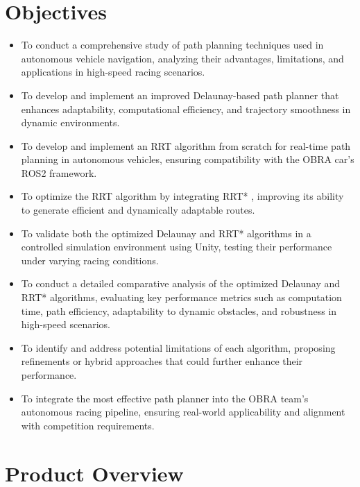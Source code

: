 \documentclass[a4paper,11pt]{report}
\begin{document}
\section{Objectives}
\begin{itemize}
    \item To conduct a comprehensive study of path planning techniques used in autonomous vehicle navigation, analyzing their advantages, limitations, and applications in high-speed racing scenarios. \cite{reference3}
    \item To develop and implement an improved Delaunay-based path planner that enhances adaptability, computational efficiency, and trajectory smoothness in dynamic environments.
    \item To develop and implement an RRT algorithm from scratch for real-time path planning in autonomous vehicles, ensuring compatibility with the OBRA car's ROS2 framework.
    \item To optimize the RRT algorithm by integrating RRT* \cite{reference4}, improving its ability to generate efficient and dynamically adaptable routes.
    \item To validate both the optimized Delaunay and RRT* algorithms in a controlled simulation environment using Unity, testing their performance under varying racing conditions.
    \item To conduct a detailed comparative analysis of the optimized Delaunay and RRT* algorithms, evaluating key performance metrics such as computation time, path efficiency, adaptability to dynamic obstacles, and robustness in high-speed scenarios.
    \item To identify and address potential limitations of each algorithm, proposing refinements or hybrid approaches that could further enhance their performance.
    \item To integrate the most effective path planner into the OBRA team's autonomous racing pipeline, ensuring real-world applicability and alignment with competition requirements.
\end{itemize}


\section{Product Overview}
\end{document}
